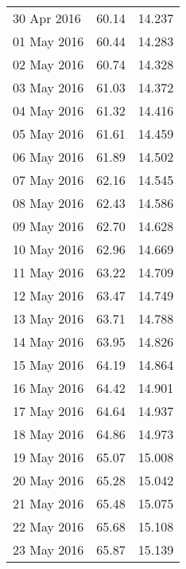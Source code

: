 \documentclass[11pt,a4paper,twoside]{article}
\begin{document}
\begin{longtable}{lcc}
30 Apr 2016                    & 60.14                & 14.237     \\
01 May 2016                    & 60.44                & 14.283     \\
02 May 2016                    & 60.74                & 14.328     \\
03 May 2016                    & 61.03                & 14.372     \\
04 May 2016                    & 61.32                & 14.416     \\
05 May 2016                    & 61.61                & 14.459     \\
06 May 2016                    & 61.89                & 14.502     \\
07 May 2016                    & 62.16                & 14.545     \\
08 May 2016                    & 62.43                & 14.586     \\
09 May 2016                    & 62.70                & 14.628     \\
10 May 2016                    & 62.96                & 14.669     \\
11 May 2016                    & 63.22                & 14.709     \\
12 May 2016                    & 63.47                & 14.749     \\
13 May 2016                    & 63.71                & 14.788     \\
14 May 2016                    & 63.95                & 14.826     \\
15 May 2016                    & 64.19                & 14.864     \\
16 May 2016                    & 64.42                & 14.901     \\
17 May 2016                    & 64.64                & 14.937     \\
18 May 2016                    & 64.86                & 14.973     \\
19 May 2016                    & 65.07                & 15.008     \\
20 May 2016                    & 65.28                & 15.042     \\
21 May 2016                    & 65.48                & 15.075     \\
22 May 2016                    & 65.68                & 15.108     \\
23 May 2016                    & 65.87                & 15.139     \\

\end{longtable}
\end{document}
